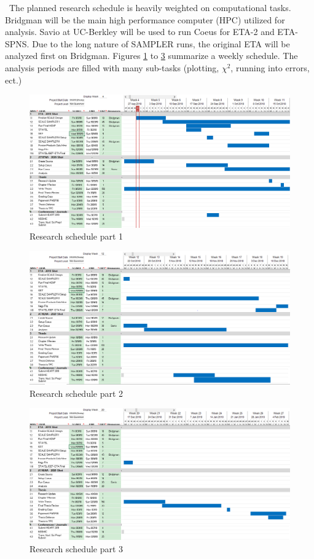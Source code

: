 \ The planned research schedule is heavily weighted on computational tasks. 
Bridgman will be the main high performance computer (HPC) utilized for analysis. 
Savio at UC-Berkley will be used to run Coeus for ETA-2 and ETA-SPNS. 
Due to the long nature of SAMPLER runs, the original ETA will be analyzed first on Bridgman. 
Figures \ref{fig:Cal1} to \ref{fig:Cal3} summarize a weekly schedule. 
The analysis periods are filled with many sub-tasks (plotting, $\chi^{2}$, running into errors, ect.)

\begin{figure}[ht]
	\includegraphics[width=\linewidth]{Figures/Chapter4/Cal1.png}
	\caption{Research schedule part 1}
	\label{fig:Cal1}
\end{figure} 

\begin{figure}[ht]
	\includegraphics[width=\linewidth]{Figures/Chapter4/Cal2.png}
	\caption{Research schedule part 2}
	\label{fig:Cal2}
\end{figure} 
\begin{figure}[ht]
	\includegraphics[width=\linewidth]{Figures/Chapter4/Cal3.png}
	\caption{Research schedule part 3}
	\label{fig:Cal3}
\end{figure} 
